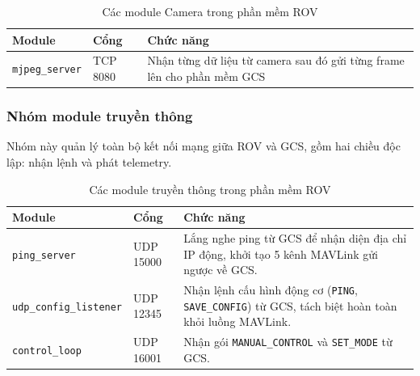 \documentclass[../DoAn.tex]{subfiles}
\begin{document}
\begin{table}[H]

\centering

\renewcommand{\arraystretch}{1.3}

\begin{tabular}{|l|l|p{6cm}|}

\hline

\textbf{Module} & \textbf{Cổng} & \textbf{Chức năng} \\

\hline

\texttt{mjpeg\_server} & TCP 8080 & Nhận từng dữ liệu từ camera sau đó gửi từng frame lên
cho phần mềm GCS\\

\hline
\end{tabular}

\caption{Các module Camera trong phần mềm ROV}

\label{tab:comm_modules}

\end{table}

\subsubsection{Nhóm module truyền thông}

Nhóm này quản lý toàn bộ kết nối mạng giữa ROV và GCS, gồm hai chiều
độc lập: nhận lệnh và phát telemetry.

\begin{table}[H]

\centering

\renewcommand{\arraystretch}{1.3}

\begin{tabular}{|l|l|p{6cm}|}

\hline

\textbf{Module} & \textbf{Cổng} & \textbf{Chức năng} \\

\hline

\texttt{ping\_server} & UDP 15000 &
Lắng nghe ping từ GCS để nhận diện địa chỉ IP động, khởi tạo 5 kênh MAVLink gửi ngược về GCS. \\

\hline

\texttt{udp\_config\_listener} & UDP 12345 &
Nhận lệnh cấu hình động cơ (\texttt{PING}, \texttt{SAVE\_CONFIG})
từ GCS, tách biệt hoàn toàn khỏi luồng MAVLink. \\

\hline

\texttt{control\_loop} & UDP 16001 & Nhận gói \texttt{MANUAL\_CONTROL} và \texttt{SET\_MODE} từ GCS. \\

\hline

\end{tabular}

\caption{Các module truyền thông trong phần mềm ROV}

\label{tab:comm_modules}

\end{table}
\end{document}
